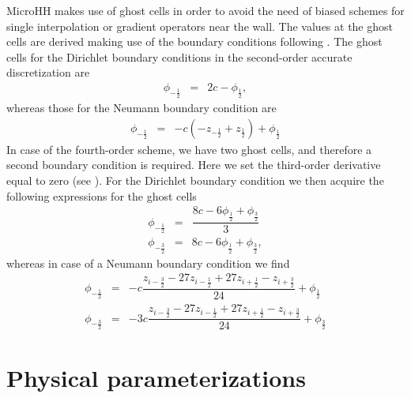 \documentclass[gmd]{copernicus}
\begin{document}
MicroHH makes use of ghost cells in order to avoid the need of biased schemes for single interpolation or gradient operators near the wall. The values at the ghost cells are derived making use of the boundary conditions following \citet{Morinishi1998}. The ghost cells for the Dirichlet boundary conditions in the second-order accurate discretization are
\begin{eqnarray}
\phi_{-\frac{1}{2}} & = & 2 c - \phi_{\frac{1}{2}},
\end{eqnarray}
whereas those for the Neumann boundary condition are
\begin{eqnarray}
\phi_{-\frac{1}{2}} & = & -c \left( - z_{-\frac{1}{2}} + z_{\frac{1}{2}} \right) + \phi_{\frac{1}{2}}
\end{eqnarray}
In case of the fourth-order scheme, we have two ghost cells, and therefore a second boundary condition is required. Here we set the third-order derivative equal to zero (see \citet{Morinishi1998}). For the Dirichlet boundary condition we then acquire the following expressions for the ghost cells
\begin{eqnarray}
\phi_{-\frac{1}{2}} & = & \dfrac{8 c - 6 \phi_{\frac{1}{2}} + \phi_{\frac{3}{2}}}{3} \\
\phi_{-\frac{3}{2}} & = & 8 c - 6 \phi_{\frac{1}{2}} + \phi_{\frac{3}{2}},
\end{eqnarray}
whereas in case of a Neumann boundary condition we find
\begin{eqnarray}
\phi_{-\frac{1}{2}} & = & -c  \dfrac{z_{i-\frac{3}{2}} - 27 z_{i-\frac{1}{2}} + 27 z_{i+\frac{1}{2}} - z_{i+\frac{3}{2}}}{24} + \phi_{\frac{1}{2}} \\
\phi_{-\frac{3}{2}} & = & -3c \dfrac{z_{i-\frac{3}{2}} - 27 z_{i-\frac{1}{2}} + 27 z_{i+\frac{1}{2}} - z_{i+\frac{3}{2}}}{24} + \phi_{\frac{3}{2}}
\end{eqnarray}

\section{Physical parameterizations}\label{sec:parametrizations}
\end{document}
